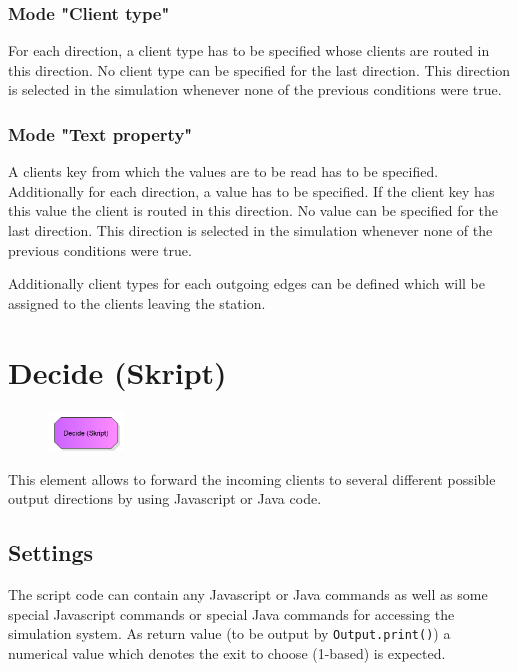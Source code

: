 \subsubsection*{Mode "Client type"}

For each direction, a client type has to be specified whose clients are routed in this direction.
No client type can be specified for the last direction. This direction is selected in the simulation
whenever none of the previous conditions were true.

\subsubsection*{Mode "Text property"}

A clients key from which the values are to be read has to be specified.
Additionally for each direction, a value has to be specified. If the client key has this value the client
is routed in this direction. No value can be specified for the last direction. This direction is selected in the simulation
whenever none of the previous conditions were true.

Additionally client types for each outgoing edges can be
defined which will be assigned to the clients leaving the station.


\section{Decide (Skript)}
\label{ref:ModelElementDecideJS}

\begin{figure}
\vspace{-22pt}
\includegraphics[width=2cm]{imageModelElementDecideJS.png}
\vspace{-22pt}
\end{figure}

This element allows to forward the incoming clients to several different possible
output directions by using Javascript or Java code.

\subsection*{Settings}

The script code can contain any Javascript or Java commands as well as some
special Javascript commands or
special Java commands for accessing the simulation system.
As return value (to be output by \texttt{Output.print()}) a numerical value
which denotes the exit to choose (1-based) is expected.


